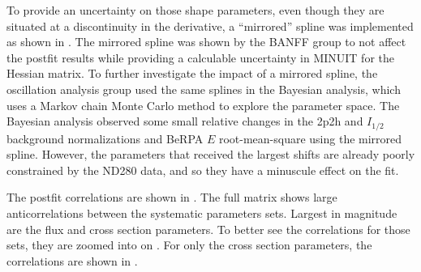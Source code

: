 To provide an uncertainty on those shape parameters, even though they
are situated at a discontinuity in the derivative, a ``mirrored''
spline was implemented as shown in .
The mirrored spline was shown by the BANFF group to not affect the
postfit results while providing a calculable uncertainty in MINUIT
for the Hessian matrix\cite{Bienstock2017}. To further investigate
the impact of a mirrored spline, the oscillation analysis group used
the same splines in the Bayesian analysis, which uses a Markov chain
Monte Carlo method to explore the parameter space. The Bayesian analysis
observed some small relative changes in the 2p2h and $I_{1/2}$ background
normalizations and BeRPA $E$ root-mean-square using the mirrored
spline. However, the parameters that received the largest shifts are
already poorly constrained by the ND280 data, and so they have a minuscule
effect on the fit.

The postfit correlations are shown in .
The full matrix shows large anticorrelations between the systematic
parameters sets. Largest in magnitude are the flux and cross section
parameters. To better see the correlations for those sets, they are
zoomed into on .
For only the cross section parameters, the correlations are shown
in .

